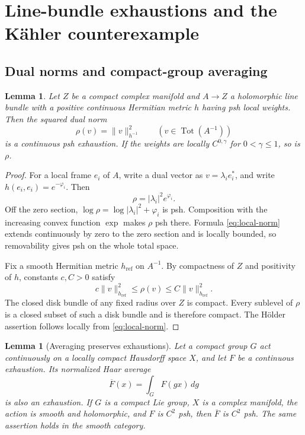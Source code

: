 \documentclass[11pt]{amsart}
\newtheorem{lemma}[theorem]{Lemma}
\theoremstyle{definition}
\theoremstyle{remark}
\numberwithin{equation}{section}
\newcommand{\Tot}{\operatorname{Tot}}
\begin{document}
\section{Line-bundle exhaustions and the K\"ahler counterexample}\label{sec:radius}

\subsection{Dual norms and compact-group averaging}

\begin{lemma}\label{lem:norm}
Let $Z$ be a compact complex manifold and $A\to Z$ a holomorphic line
bundle with a positive continuous Hermitian metric $h$ having psh
local weights. Then the squared dual norm
\[
 \rho(v)=\|v\|_{h^{-1}}^2\qquad(v\in\Tot(A^{-1}))
\]
is a continuous psh exhaustion. If the weights are locally
$C^{0,\gamma}$ for $0<\gamma\le1$, so is $\rho$.
\end{lemma}

\begin{proof}
For a local frame $e_i$ of $A$, write a dual vector as
$v=\lambda_i e_i^*$, and write $h(e_i,e_i)=e^{-\varphi_i}$. Then
\begin{equation}\label{eq:local-norm}
 \rho=|\lambda_i|^2e^{\varphi_i}.
\end{equation}
Off the zero section, $\log\rho=\log|\lambda_i|^2+\varphi_i$ is psh.
Composition with the increasing convex function $\exp$ makes $\rho$
psh there. Formula \eqref{eq:local-norm} extends continuously by zero
to the zero section and is locally bounded, so removability gives psh
on the whole total space.

Fix a smooth Hermitian metric $h_{\mathrm{ref}}$ on $A^{-1}$. By
compactness of $Z$ and positivity of $h$, constants $c,C>0$ satisfy
\[
 c\|v\|_{h_{\mathrm{ref}}}^2
 \le\rho(v)\le C\|v\|_{h_{\mathrm{ref}}}^2.
\]
The closed disk bundle of any fixed radius over $Z$ is compact.
Every sublevel of $\rho$ is a closed subset of such a disk bundle and
is therefore compact. The H\"older assertion follows locally from
\eqref{eq:local-norm}.
\end{proof}

\begin{lemma}[Averaging preserves exhaustions]\label{lem:average}
Let a compact group $G$ act continuously on a locally compact Hausdorff
space $X$, and let $F$ be a continuous exhaustion. Its normalized Haar average
\[
 \overline F(x)=\int_G F(gx)\,dg
\]
is also an exhaustion. If $G$ is a compact Lie group, $X$ is a complex
manifold, the action is smooth and holomorphic, and $F$ is $C^2$ psh,
then $\overline F$ is $C^2$ psh. The same assertion holds in the
smooth category.
\end{lemma}
\end{document}
